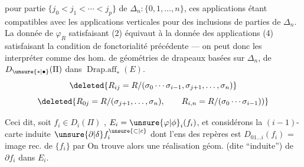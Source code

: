 
pour  partie $\{j_0<j_1<\cdots<j_p\}$ de $\Delta_n:\{0,1,\ldots,n\}$, ces applications étant compatibles avec les applications verticales pour des inclusions de parties de $\Delta_n$. La donnée de $\varphi_R$ satisfaisant (2) équivaut à la donnée des applications (4) satisfaisant la condition de fonctorialité précédente --- on peut donc les interpréter  comme des hom. de géométries de drapeaux basées sur  $\Delta_n$, de $D_{\unsure{*|\bullet}}(\Pi)$ dans $\operatorname{Drap.aff}_*(E)$.
\[
\deleted{R_{ij}=R/(\sigma_0\cdots\sigma_{i-1},\sigma_{j+1},\ldots,\sigma_n)}
\]
\[
\deleted{R_{0j}=R/(\sigma_{j+1},\ldots,\sigma_n),\qquad R_{i,n}=R/(\sigma_0\cdots\sigma_{i-1}))}
\]

Ceci dit, soit $f_i\in D_i(\Pi)$ , $E_i=\unsure{\varphi|\phi}_i(f_i)$, et considérons la $(i-1)$-carte induite $\unsure{\partial|\delta}f_i^{\unsure{\subset|c}}$ dont l'ens des repères est $D_{01\ldots i}(f_i)$ = image rec. de $\{f_i\}$ par
On trouve alors  une réalisation géom.  (dite ``induite'') de $\partial f_i$ dans $E_i$.

